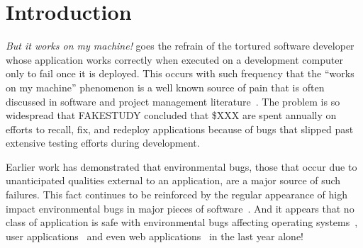 \section{Introduction}
\label{SEC:introduction}

\textit{But it works on my machine!} goes the refrain of the tortured
software developer whose application works correctly when executed on a
development computer only to fail once it is deployed.  This occurs with
such frequency that the ``works on my machine'' phenomenon is a well known
source of pain that is often discussed in software and project management
literature~\cite{notreal}.  The problem is so widespread that FAKESTUDY
concluded that \$XXX are spent annually on efforts to recall, fix, and
redeploy applications because of bugs that slipped past extensive testing
efforts during development.

Earlier work has demonstrated that environmental bugs, those that occur due
to unanticipated qualities external to an application, are a major source
of such failures.  This fact continues to be reinforced by the regular
appearance of high impact environmental bugs in major pieces of
software~\cite{devzeroroot}.  And it appears that no class of application
is safe with environmental bugs affecting operating systems~\cite{bad},
user applications~\cite{bad} and even web applications~\cite{bad} in the
last year alone!




